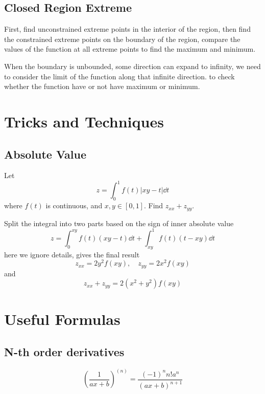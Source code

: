 \documentclass[a4]{overview}
\begin{document}
\subsection{Closed Region Extreme}

First, find unconstrained extreme points in the interior of the region,
then find the constrained extreme points on the boundary of the region,
compare the values of the function at all extreme points to find the maximum and minimum.

\begin{remark}
	When the boundary is unbounded, some direction can expand to infinity, 
	we need to consider the limit of the function along that infinite direction.
	to check whether the function have or not have maximum or minimum.
	
\end{remark}

\section{Tricks and Techniques}

\subsection{Absolute Value}

\begin{example}
	Let
	\[
	z=\int_0^1f(t)|xy-t| \dd t
	\] 
	where $f(t)$ is continuous, and $x,y\in[0,1]$. Find $z_{xx}+z_{yy}$.	

	\begin{answer}
		Split the integral into two parts based on the sign of inner absolute value
		\[
		z = \int_0^{xy} f(t)(xy-t) \dd t + \int_{xy}^1 f(t)(t-xy) \dd t
		\] 
		here we ignore details, gives the final result
		\[
			z_{xx} = 2y^2f(xy), \quad z_{yy} = 2x^2f(xy)
		\]
		and
		\[
			z_{xx}+z_{yy} = 2(x^2+y^2)f(xy)
		\] 
	\end{answer}

\end{example}

\section{Useful Formulas}

\subsection{N-th order derivatives}

\begin{equation}
	\left(\frac{1}{ax+b}\right)^{(n)} = \frac{(-1)^n n! a^n}{(ax+b)^{n+1}}
\end{equation}
\end{document}
